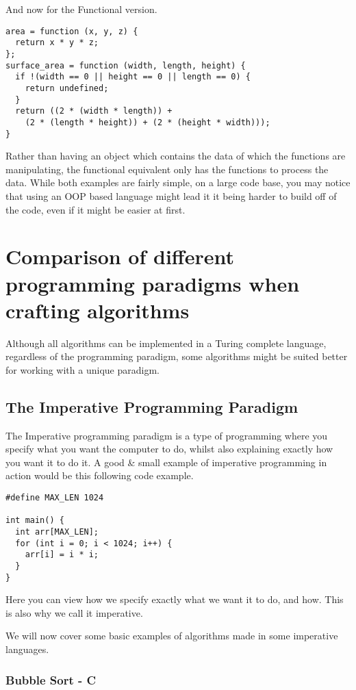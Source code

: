 \documentclass{report}
\begin{document}
And now for the Functional version.

\begin{lstlisting}
area = function (x, y, z) {
  return x * y * z;
};
surface_area = function (width, length, height) {
  if !(width == 0 || height == 0 || length == 0) {
    return undefined;
  }
  return ((2 * (width * length)) + 
    (2 * (length * height)) + (2 * (height * width)));
}
\end{lstlisting}

Rather than having an object which contains the data of which the functions are manipulating, the functional equivalent only has the functions to process the data. While both examples are fairly simple, on a large code base, you may notice that using an OOP based language might lead it it being harder to build off of the code, even if it might be easier at first.


\chapter{Comparison of different programming paradigms when crafting algorithms}
Although all algorithms can be implemented in a Turing complete language, regardless of the programming paradigm, some algorithms might be suited better for working with a unique paradigm.
\section{The Imperative Programming Paradigm}
The Imperative programming paradigm is a type of programming where you specify what you want the computer to do, whilst also explaining exactly how you want it to do it. A good \& small example of imperative programming in action would be this following code example.
\begin{lstlisting}
#define MAX_LEN 1024

int main() {
  int arr[MAX_LEN];
  for (int i = 0; i < 1024; i++) {
    arr[i] = i * i;
  }
}
\end{lstlisting}
Here you can view how we specify exactly what we want it to do, and how. This is also why we call it imperative.

We will now cover some basic examples of algorithms made in some imperative languages.

\subsection{Bubble Sort - C} %
\end{document}
